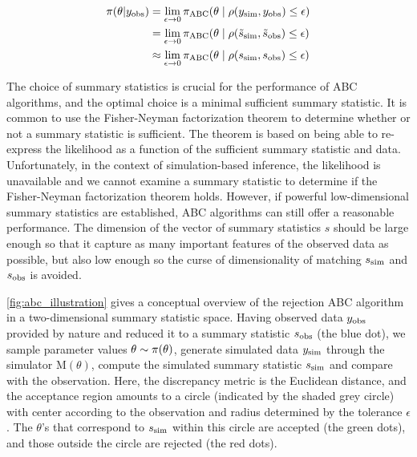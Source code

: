 \begin{equation}
\begin{aligned}
    \pi \qty(\theta | y_\mathrm{obs} ) &= \lim_{\epsilon \to 0} \pi_\mathrm{ABC} \qty(\theta \mid \rho \qty (y_\mathrm{sim}, y_\mathrm{obs}) \leq \epsilon) 
    \\
    &= \lim_{\epsilon \to 0} \pi_\mathrm{ABC} \qty(\theta \mid \rho \qty (\tilde{s}_\mathrm{sim}, \tilde{s}_\mathrm{obs}) \leq \epsilon)
    \\
    &\approx \lim_{\epsilon \to 0} \pi_\mathrm{ABC} \qty(\theta \mid \rho \qty (s_\mathrm{sim}, s_\mathrm{obs}) \leq \epsilon)
\end{aligned}
\end{equation}

The choice of summary statistics is crucial for the performance of ABC algorithms, and the optimal choice is a minimal sufficient summary statistic. It is common to use the Fisher-Neyman factorization theorem to determine whether or not a summary statistic is sufficient. The theorem is based on being able to re-express the likelihood as a function of the sufficient summary statistic and data. Unfortunately, in the context of simulation-based inference, the likelihood is unavailable and we cannot examine a summary statistic to determine if the Fisher-Neyman factorization theorem holds. However, if powerful low-dimensional summary statistics are established, ABC algorithms can still offer a reasonable performance. The dimension of the vector of summary statistics $s$ should be large enough so that it capture as many important features of the observed data as possible, but also low enough so the curse of dimensionality of matching $s_\mathrm{sim}$ and $s_\mathrm{obs}$ is avoided. 

\autoref{fig:abc_illustration} gives a conceptual overview of the rejection ABC algorithm in a two-dimensional summary statistic space. Having observed data $y_\mathrm{obs}$ provided by nature and reduced it to a summary statistic $s_\mathrm{obs}$ (the blue dot), we sample parameter values $\theta \sim \pi \qty(\theta)$, generate simulated data $y_\mathrm{sim}$ through the simulator $\mathrm{M}(\theta)$, compute the simulated summary statistic $s_\mathrm{sim}$ and compare with the observation. Here, the discrepancy metric is the Euclidean distance, and the acceptance region amounts to a circle (indicated by the shaded grey circle) with center according to the observation and radius determined by the tolerance $\epsilon$. The $\theta$'s that correspond to $s_\mathrm{sim}$ within this circle are accepted (the green dots), and those outside the circle are rejected (the red dots). 

